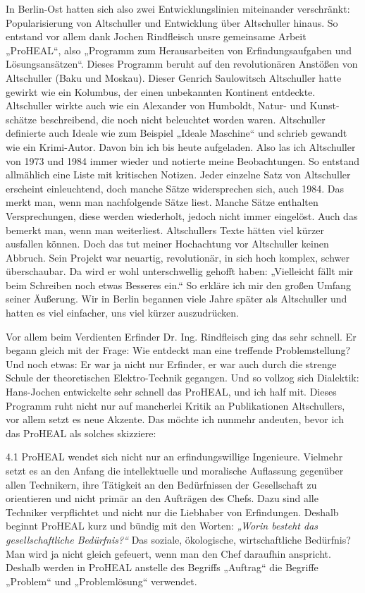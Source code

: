 \documentclass[12pt,a4paper]{article}
\begin{document}
In Berlin-Ost hatten sich also zwei Entwicklungslinien miteinander
verschränkt: Popularisierung von Altschuller und Entwicklung über Altschuller
hinaus. So entstand vor allem dank Jochen Rindfleisch unsre gemeinsame Arbeit
„ProHEAL“, also „Programm zum Herausarbeiten von Erfindungsaufgaben und
Lösungsansätzen“. Dieses Programm beruht auf den revolutionären Anstößen von
Altschuller (Baku und Moskau). Dieser Genrich Saulowitsch Altschuller hatte
gewirkt wie ein Kolumbus, der einen unbekannten Kontinent entdeckte.
Altschuller wirkte auch wie ein Alexander von Humboldt, Natur- und Kunst-
schätze beschreibend, die noch nicht beleuchtet worden waren. Altschuller
definierte auch Ideale wie zum Beispiel „Ideale Maschine“ und schrieb gewandt
wie ein Krimi-Autor. Davon bin ich bis heute aufgeladen. Also las ich
Altschuller von 1973 und 1984 immer wieder und notierte meine
Beobachtungen. So entstand allmählich eine Liste mit kritischen Notizen. Jeder
einzelne Satz von Altschuller erscheint einleuchtend, doch manche Sätze
widersprechen sich, auch 1984. Das merkt man, wenn man nachfolgende Sätze
liest. Manche Sätze enthalten Versprechungen, diese werden wiederholt, jedoch
nicht immer eingelöst. Auch das bemerkt man, wenn man
weiterliest. Altschullers Texte hätten viel kürzer ausfallen können. Doch das
tut meiner Hochachtung vor Altschuller keinen Abbruch. Sein Projekt war
neuartig, revolutionär, in sich hoch komplex, schwer überschaubar. Da wird er
wohl unterschwellig gehofft haben: „Vielleicht fällt mir beim Schreiben noch
etwas Besseres ein.“ So erkläre ich mir den großen Umfang seiner Äußerung. Wir
in Berlin begannen viele Jahre später als Altschuller und hatten es viel
einfacher, uns viel kürzer auszudrücken.

Vor allem beim Verdienten Erfinder Dr. Ing. Rindfleisch ging das sehr
schnell. Er begann gleich mit der Frage: Wie entdeckt man eine treffende
Problemstellung?  Und noch etwas: Er war ja nicht nur Erfinder, er war auch
durch die strenge Schule der theoretischen Elektro-Technik gegangen. Und so
vollzog sich Dialektik: Hans-Jochen entwickelte sehr schnell das ProHEAL,
und ich half mit. Dieses Programm ruht nicht nur auf mancherlei Kritik an
Publikationen Altschullers, vor allem setzt es neue Akzente. Das möchte ich
nunmehr andeuten, bevor ich das ProHEAL als solches skizziere:

4.1 ProHEAL wendet sich nicht nur an erfindungswillige Ingenieure. Vielmehr
setzt es an den Anfang die intellektuelle und moralische Auflassung gegenüber
allen Technikern, ihre Tätigkeit an den Bedürfnissen der Gesellschaft zu
orientieren und nicht primär an den Aufträgen des Chefs. Dazu sind alle
Techniker verpflichtet und nicht nur die Liebhaber von Erfindungen. Deshalb
beginnt ProHEAL kurz und bündig mit den Worten: \emph{„Worin besteht das
  gesellschaftliche Bedürfnis?“} Das soziale, ökologische, wirtschaftliche
Bedürfnis? Man wird ja nicht gleich gefeuert, wenn man den Chef daraufhin
anspricht. Deshalb werden in ProHEAL anstelle des Begriffs „Auftrag“ die
Begriffe „Problem“ und „Problemlösung“ verwendet.
\end{document}
